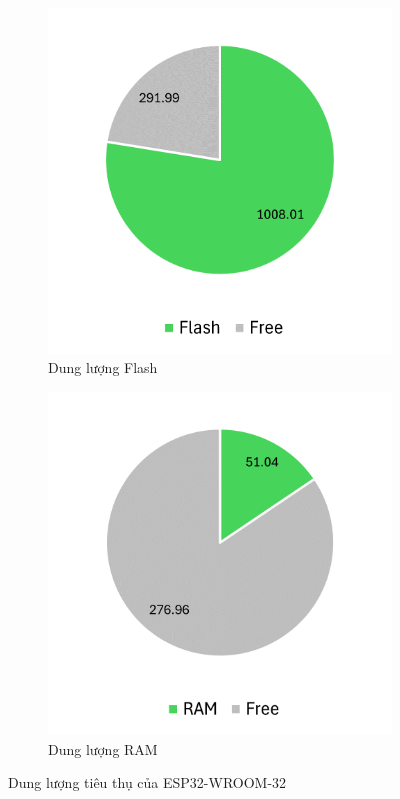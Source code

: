 \begin{figure}[H]
\centering
\begin{subfigure}[b]{0.495\textwidth} 
         \centering
         \includegraphics[width=\textwidth]{images/esp32flash.png}
         \caption{Dung lượng Flash}
\end{subfigure}
\hfill
\begin{subfigure}[b]{0.495\textwidth}
         \centering
         \includegraphics[width=\textwidth]{images/esp32ram.png}
         \caption{Dung lượng RAM}
\end{subfigure}
\caption{Dung lượng tiêu thụ của ESP32-WROOM-32}
\label{fig:esp32mem}
\end{figure}

